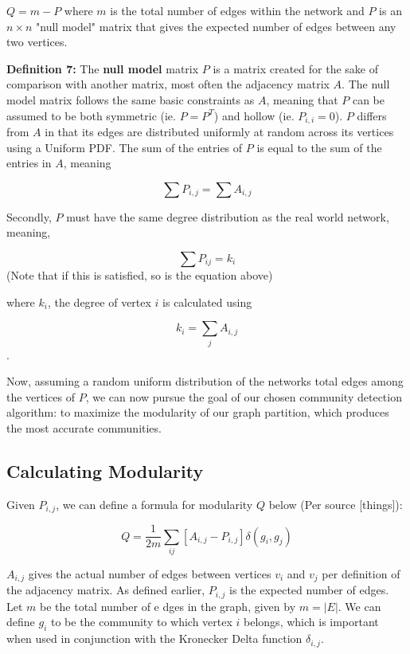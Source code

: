 \documentclass{article}
\begin{document}
\indent $Q = m - P$ where $m$ is the total number of edges within the network and $P$ is an $n \times n$ "null model" matrix that gives the expected number of edges between any two vertices. 

\bigskip

\textbf{Definition 7:} The \textbf{null model} matrix $P$ is a matrix created for the sake of comparison with another matrix, most often the adjacency matrix $A$. 
The null model matrix follows the same basic constraints as $A$, meaning that $P$ can be assumed to be both symmetric (ie. $P = P^T$) and hollow (ie. $P_{i,i} = 0$). 
$P$ differs from $A$ in that its edges are distributed uniformly at random across its vertices using a Uniform PDF. 
The sum of the entries of $P$ is equal to the sum of the entries in $A$, meaning

$$\sum P_{i,j} = \sum A_{i,j}$$

\bigskip

Secondly, $P$ must have the same degree distribution as the real world network, meaning,

\bigskip

$$\sum P_{ij} = k_{i}$$
(Note that if this is satisfied, so is the equation above)

\bigskip

where $k_{i}$, the degree of vertex $i$ is calculated using

\bigskip

$$k_{i} = \sum_{j} A_{i,j}$$.

\bigskip

\noindent Now, assuming a random uniform distribution of the networks total edges among the vertices of $P$, 
we can now pursue the goal of our chosen community detection algorithm: to maximize the modularity of our graph partition, 
which produces the most accurate communities.

\bigskip

\subsection*{Calculating Modularity}
Given $P_{i,j}$, we can define a formula for modularity $Q$ below (Per source [things]):

$$ Q = \dfrac{1}{2m}\sum_{ij} [A_{i,j} - P_{i,j}]\delta (g_i, g_j) $$ 

$A_{i,j}$ gives the actual number of edges between vertices $v_i$ and $v_j$ per definition of the adjacency matrix.
As defined earlier, $P_{i,j}$ is the expected number of edges. 
Let $m$ be the total number of e  dges in the graph, given by $m = |E|$. 
We can define $g_i$ to be the community to which vertex $i$ belongs, which is important when used in conjunction with the Kronecker Delta function $\delta_{i,j}$.
\end{document}

